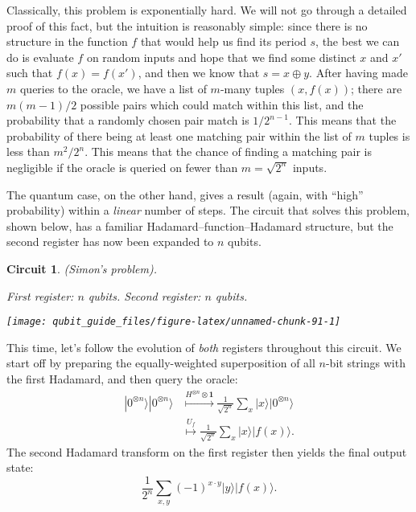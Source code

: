 \documentclass[fleqn]{article}
\newtheorem*{circuit}{Circuit}
\begin{document}
Classically, this problem is exponentially hard.
We will not go through a detailed proof of this fact, but the intuition is reasonably simple: since there is no structure in the function \(f\) that would help us find its period \(s\), the best we can do is evaluate \(f\) on random inputs and hope that we find some distinct \(x\) and \(x'\) such that \(f(x)=f(x')\), and then we know that \(s=x\oplus y\).
After having made \(m\) queries to the oracle, we have a list of \(m\)-many tuples \((x,f(x))\); there are \(m(m-1)/2\) possible pairs which could match within this list, and the probability that a randomly chosen pair match is \(1/2^{n-1}\).
This means that the probability of there being at least one matching pair within the list of \(m\) tuples is less than \(m^2/2^n\).
This means that the chance of finding a matching pair is negligible if the oracle is queried on fewer than \(m=\sqrt{2^n}\) inputs.

The quantum case, on the other hand, gives a result (again, with ``high'' probability) within a \emph{linear} number of steps.
The circuit that solves this problem, shown below, has a familiar Hadamard--function--Hadamard structure, but the second register has now been expanded to \(n\) qubits.

\begin{circuit}

(Simon's problem).

\emph{First register: \(n\) qubits. Second register: \(n\) qubits.}

\begin{center}\texttt{[image: qubit\_guide\_files/figure-latex/unnamed-chunk-91-1]} \end{center}

\end{circuit}

This time, let's follow the evolution of \emph{both} registers throughout this circuit.
We start off by preparing the equally-weighted superposition of all \(n\)-bit strings with the first Hadamard, and then query the oracle:
\[
  \begin{aligned}
    |0^{\otimes n}\rangle|0^{\otimes n}\rangle
    &\overset{H^{\otimes n}\otimes\mathbf{1}}{\longmapsto}
    \frac{1}{\sqrt{2^n}} \sum_x |x\rangle|0^{\otimes n}\rangle
  \\&\overset{U_f}{\longmapsto}
    \frac{1}{\sqrt{2^n}} \sum_x |x\rangle|f(x)\rangle.
  \end{aligned}
\]
The second Hadamard transform on the first register then yields the final output state:
\[
  \frac{1}{2^n} \sum_{x,y} (-1)^{x\cdot y} |y\rangle|f(x)\rangle.
\tag{$\ddagger$}
\]
\end{document}

